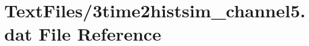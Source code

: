 \hypertarget{3time2histsim__channel5_8dat}{}\section{Text\+Files/3time2histsim\+\_\+channel5.dat File Reference}
\label{3time2histsim__channel5_8dat}
